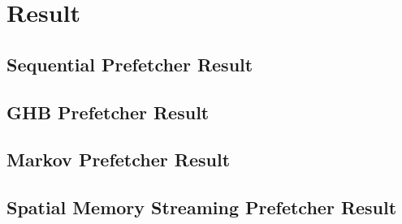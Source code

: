 
\section{Result}
\label{sec:result}

\subsection{Sequential Prefetcher Result}
\label{sec:sequentialPrefetcherResult}

\subsection{GHB Prefetcher Result}
\label{sec:ghbPrefetcherResult}

\subsection{Markov Prefetcher Result}
\label{sec:markovPrefetcherResult}

\subsection{Spatial Memory Streaming Prefetcher Result}
\label{sec:smsPrefetcherResult}

